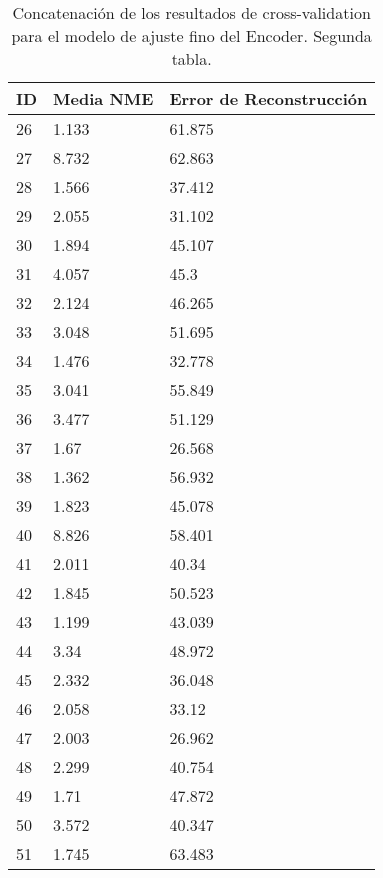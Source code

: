\begin{table}[!ht]
    \centering
    \caption{Concatenación de los resultados de cross-validation para el modelo de ajuste fino del Encoder. Segunda tabla.}
    \begin{tabular}{|l|l|l|}
    \hline
    \cellcolor{gray!25}\textbf{ID} & \cellcolor{gray!25}\textbf{Media NME} & \cellcolor{gray!25}\textbf{Error de Reconstrucción} \\ \hline
        26 & 1.133 & 61.875 \\ \hline
        27 & 8.732 & 62.863 \\ \hline
        28 & 1.566 & 37.412 \\ \hline
        29 & 2.055 & 31.102 \\ \hline
        30 & 1.894 & 45.107 \\ \hline
        31 & 4.057 & 45.3 \\ \hline
        32 & 2.124 & 46.265 \\ \hline
        33 & 3.048 & 51.695 \\ \hline
        34 & 1.476 & 32.778 \\ \hline
        35 & 3.041 & 55.849 \\ \hline
        36 & 3.477 & 51.129 \\ \hline
        37 & 1.67 & 26.568 \\ \hline
        38 & 1.362 & 56.932 \\ \hline
        39 & 1.823 & 45.078 \\ \hline
        40 & 8.826 & 58.401 \\ \hline
        41 & 2.011 & 40.34 \\ \hline
        42 & 1.845 & 50.523 \\ \hline
        43 & 1.199 & 43.039 \\ \hline
        44 & 3.34 & 48.972 \\ \hline
        45 & 2.332 & 36.048 \\ \hline
        46 & 2.058 & 33.12 \\ \hline
        47 & 2.003 & 26.962 \\ \hline
        48 & 2.299 & 40.754 \\ \hline
        49 & 1.71 & 47.872 \\ \hline
        50 & 3.572 & 40.347 \\ \hline
        51 & 1.745 & 63.483 \\ \hline
    \end{tabular}
\end{table}

